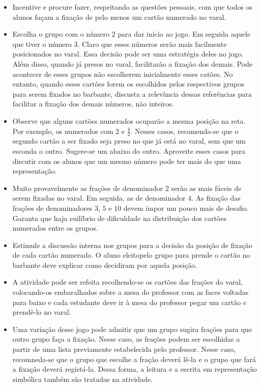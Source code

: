 \documentclass[oneside]{book}
\begin{document}
\begin{multicols}{2}
\begin{itemize}
  \item Incentive e procure fazer, respeitando as questões pessoais, com que todos os alunos façam a fixação de pelo menos um cartão numerado no varal. 
  \item Escolha o grupo com o número $2$ para dar início ao jogo. Em seguida aquele que tiver o número 3. Claro que esses números serão mais facilmente posicionados no varal. Essa decisão pode ser uma estratégia deles no jogo. Além disso, quando já presos no varal, facilitarão a fixação dos demais. Pode acontecer de esses grupos não escolherem inicialmente esses catões. No entanto, quando esses cartões forem os escolhidos pelos respectivos grupos para serem fixados no barbante, discusta a relevância dessas referências para facilitar a fixação dos demais números, não inteiros.      
  \item Observe que alguns cartões numerados ocuparão a mesma posição na reta. Por exemplo, os numerados com $2$ e $\frac{4}{2}$. Nesses casos, recomenda-se que o segundo cartão a ser fixado seja preso no que já está no varal, sem que um esconda o outro. Sugere-se um abaixo do outro. Aproveite esses casos para discutir com os alunos que um mesmo número pode ter mais do que uma representação.
  \item Muito provavelmente as frações de denominador $2$ serão as mais fáceis de serem fixadas no varal. Em seguida, as de denominador $4$. As fixação das frações de denominadores $3$, $5$ e $10$ devem impor um pouco mais de desafio. Garanta que haja euilíbrio de dificuldade na distribuição dos cartões numerados entre os grupos.
  \item Estimule a discussão interna nos grupos para a decisão da posição de fixação de cada cartão numerado. O aluno eleitopelo grupo para prende o cartão no barbante deve explicar como decidiram por aquela posição.
  \item A atividade pode ser refeita recolhendo-se os cartões das frações do varal, colocando-os embaralhados sobre a mesa do professor com as faces voltadas para baixo e cada estudante deve ir à mesa do professor pegar um cartão e prendê-lo no varal.
  \item Uma variação desse jogo pode admitir que um grupo sugira frações para que outro grupo faça a fixação. Nesse caso, as frações podem ser escolhidas a partir de uma lista previamente estabelecida pelo professor. Nesse caso, recomneda-se que o grupo que escolhe a fração deverá lê-la e o grupo que fará a fixação deverá registá-la. Dessa forma, a leitura e a escrita em representação simbólica também são tratadas na atividade.
\end{itemize} %


\end{multicols}
\end{document}
